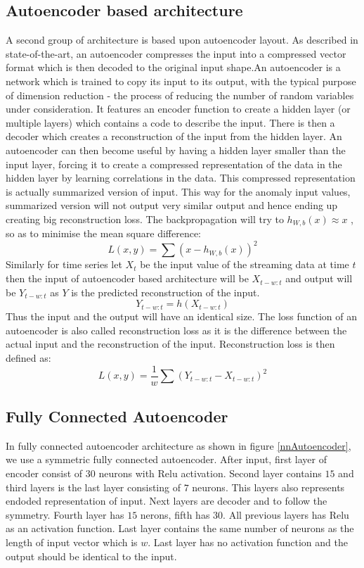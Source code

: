 \documentclass[12pt]{article}
\begin{document}
\subsection{Autoencoder based architecture}
A second group of architecture is based upon autoencoder layout. As described in state-of-the-art, an autoencoder compresses the input into a compressed vector format which is then decoded to the original input shape.An autoencoder is a network which is trained to copy its input to its output, with the typical purpose of dimension reduction - the process of reducing the number of random variables under consideration. It features an encoder function to create a hidden layer (or multiple layers) which contains a code to describe the input. There is then a decoder which creates a reconstruction of the input from the hidden layer. An autoencoder can then become useful by having a hidden layer smaller than the input layer, forcing it to create a compressed representation of the data in the hidden layer by learning correlations in the data. This compressed representation is actually summarized version of input. This way for the anomaly input values, summarized version will not output very similar output and hence ending up creating big reconstruction loss.
The backpropagation will try to  $h_{W,b}(x) \approx x$ , so as to minimise the mean square difference:
\begin{equation}
L(x,y) = \sum(x-h_{W,b}(x))^2
\end{equation}
Similarly for time series let $X_t$ be the input value of the streaming data at time $t$ then the input of autoencoder based architecture will be $X_{t-w:t}$ and output will be $Y_{t-w:t}$ as $Y$ is the predicted reconstruction of the input. 
\begin{equation}
Y_{t-w:t} = h(X_{t-w:t})
\end{equation}
Thus the input and the output will have an identical size. The loss function of an autoencoder is also called reconstruction loss as it is the difference between the actual input and the reconstruction of the input. Reconstruction loss is then defined as:
\begin{equation}
L(x,y) = \frac{1}{w}\sum(Y_{t-w:t}-X_{t-w:t})^2
\end{equation}
\newpage
\subsection{Fully Connected Autoencoder}
In fully connected autoencoder architecture as shown in figure \ref{nnAutoencoder}, we use a symmetric fully connected autoencoder. After input, first layer of encoder consist of $30$ neurons with Relu activation. Second layer contains $15$ and third layers is the last layer consisting of $7$ neurons. This layers also represents endoded representation of input. Next layers are decoder and to follow the symmetry. Fourth layer has $15$ nerons, fifth has $30$. All previous layers has Relu as an activation function. Last layer contains the same number of neurons as the length of input vector which is $w$. Last layer has no activation function and the output should be identical to the input.
\end{document}
